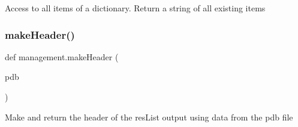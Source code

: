 \begin{DoxyVerb}Access to all items of a dictionary. Return a string of all existing items\end{DoxyVerb}
 \mbox{\label{namespacemanagement_ab684f6dcec493b3604c10971f42a104d}} 
\subsubsection{\texorpdfstring{make\+Header()}{makeHeader()}}
{\footnotesize\ttfamily def management.\+make\+Header (\begin{DoxyParamCaption}\item[{}]{pdb }\end{DoxyParamCaption})}

\begin{DoxyVerb}Make and return the header of the resList output using data from the pdb file\end{DoxyVerb}
 
